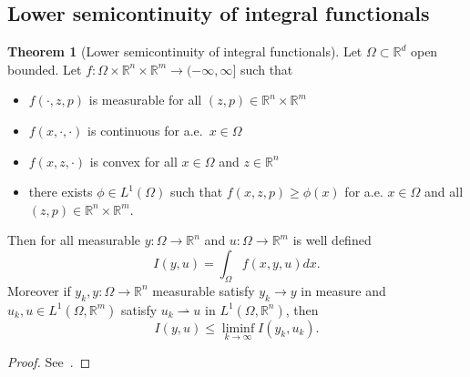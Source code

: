 \documentclass[a4paper,10pt,oneside]{amsbook}
\numberwithin{section}{chapter}
\numberwithin{equation}{chapter}
\theoremstyle{definition}
\newtheorem{thm}[prop]{Theorem}
\DeclarePairedDelimiter{\norm}{\lVert}{\rVert}
\begin{document}
%
%

\subsection{Lower semicontinuity of integral functionals}

\begin{thm}[Lower semicontinuity of integral functionals]
\label{thm:lower-semicontinuity-integral-functional}
Let $\Omega\subset\mathbb{R}^d$ open bounded. Let $f\colon\Omega\times\mathbb{R}^n\times\mathbb{R}^m\to(-\infty,\infty]$ such that
\begin{itemize}
\item[(i)] $f(\cdot,z,p)$ is measurable for all $(z,p)\in\mathbb{R}^n\times\mathbb{R}^m$
\item[(ii)] $f(x,\cdot,\cdot)$ is continuous for a.e.\ $x\in\Omega$
\item[(iii)] $f(x,z,\cdot)$ is convex for all $x\in\Omega$ and $z\in\mathbb{R}^n$
\item[(iv)] there exists $\phi\in L^1(\Omega)$ such that $f(x,z,p)\ge\phi(x)$ for a.e. $x\in\Omega$ and all $(z,p)\in\mathbb{R}^n\times\mathbb{R}^m$.
\end{itemize}
Then for all measurable $y\colon\Omega\to\mathbb{R}^n$ and $u\colon\Omega\to\mathbb{R}^m$ is well defined
\[
I(y,u)=\int_\Omega f(x,y,u)dx.
\]
Moreover if $y_k,y\colon\Omega\to\mathbb{R}^n$ measurable satisfy $y_k\to y$ in measure and $u_k,u\in L^1(\Omega,\mathbb{R}^m)$ satisfy $u_k\rightharpoonup u$ in $L^1(\Omega,\mathbb{R}^n)$, then
\[
I(y,u)\le\liminf_{k\to\infty}I(y_k,u_k).
\]
\end{thm}
\begin{proof}
See~\cite{eisen1979selection}.
\end{proof}
\end{document}
